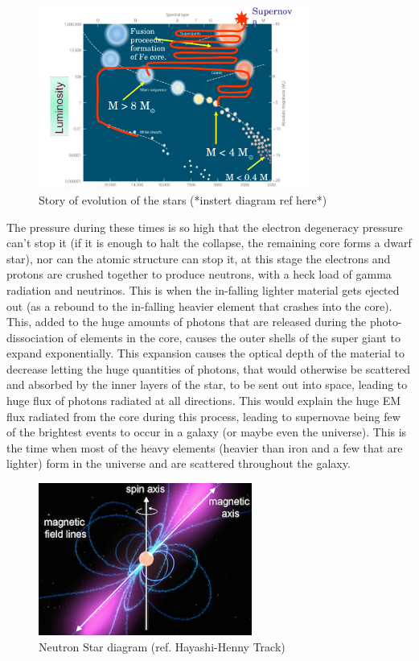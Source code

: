 \documentclass[a4paper,twoside]{report}
\numberwithin{equation}{section}
\begin{document}
\paragraph{}
\begin{figure}
\includegraphics[width=1.0\linewidth, height=6cm]{evo_of_stars.jpg}
\caption{Story of evolution of the stars (*instert diagram ref here*)}
\label{NS_Diagram}
\end{figure}
The pressure during these times is so high that the electron degeneracy pressure can't stop it (if it is enough to halt the collapse, the remaining core forms a dwarf star), nor can the atomic structure can stop it, at this stage the electrons and protons are crushed together to produce neutrons, with a heck load of gamma radiation and neutrinos. This is when the in-falling lighter material gets ejected out (as a rebound to the in-falling heavier element that crashes into the core). This, added to the huge amounts of photons that are released during the photo-dissociation of elements in the core, causes the outer shells of the super giant to expand exponentially. This expansion causes the optical depth of the material to decrease letting the huge quantities of photons, that would otherwise be scattered and absorbed by the inner layers of the star, to be sent out into space, leading to huge flux of photons radiated at all directions. This would explain the huge EM flux radiated from the core during this process, leading to supernovae being few of the brightest events to occur in a galaxy (or maybe even the universe). This is the time when most of the heavy elements (heavier than iron and a few that are lighter) form in the universe and are scattered throughout the galaxy. 
\\
\begin{figure}
\includegraphics[width=1.0\linewidth, height=5cm]{ns_pulsar_diagram.png}
\caption{Neutron Star diagram (ref. Hayashi-Henny Track)}
\label{Star Evolution Diagram}
\end{figure}
\end{document}
